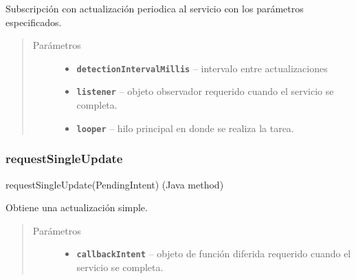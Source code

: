 \begin{fulllineitems}
\label{org/hardroid/api/ActivityRecognitionApi:org.hardroid.api.ActivityRecognitionApi.requestActivityUpdates(long, ActivityRecognitionListener, Looper)}\par
Subscripción con actualización periodica al servicio con los parámetros especificados.
\begin{quote}\begin{description}
\item[{Parámetros}] \leavevmode\begin{itemize}
\item {} 
\textbf{\texttt{detectionIntervalMillis}} -- intervalo entre actualizaciones

\item {} 
\textbf{\texttt{listener}} -- objeto observador requerido cuando el servicio se completa. 

\item {} 
\textbf{\texttt{looper}} -- hilo principal en donde se realiza la tarea.

\end{itemize}

\end{description}\end{quote}

\end{fulllineitems}


\subsubsection{requestSingleUpdate}
\label{org/hardroid/api/ActivityRecognitionApi:requestsingleupdate}requestSingleUpdate(PendingIntent) (Java method)

\begin{fulllineitems}
\label{org/hardroid/api/ActivityRecognitionApi:org.hardroid.api.ActivityRecognitionApi.requestSingleUpdate(PendingIntent)}\par
Obtiene una actualización simple.
\begin{quote}\begin{description}
\item[{Parámetros}] \leavevmode\begin{itemize}
\item {} 
\textbf{\texttt{callbackIntent}} --  objeto de función diferida requerido cuando el servicio se completa. 

\end{itemize}

\end{description}\end{quote}

\end{fulllineitems}

